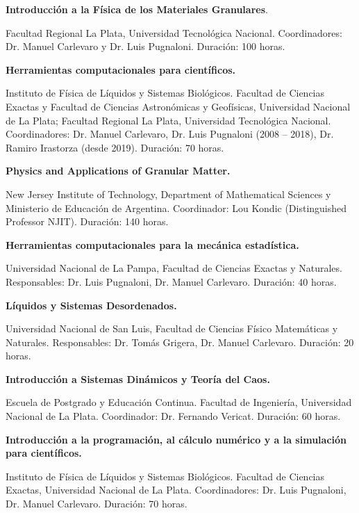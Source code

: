 \begin{timeline}
 \textbf{Introducción a la Física de los Materiales Granulares}. 

Facultad Regional La Plata, Universidad Tecnológica Nacional. Coordinadores: Dr. Manuel Carlevaro y Dr. Luis Pugnaloni. Duración: 100 horas.

 \textbf{Herramientas computacionales para científicos.}

 Instituto de Física de Líquidos y Sistemas Biológicos. Facultad de Ciencias Exactas y Facultad de Ciencias Astronómicas y Geofísicas, Universidad Nacional de La Plata; Facultad Regional La Plata, Universidad Tecnológica Nacional. Coordinadores: Dr. Manuel Carlevaro, Dr. Luis Pugnaloni (2008 -- 2018), Dr. Ramiro Irastorza (desde 2019). Duración: 70 horas.

 \textbf{Physics and Applications of Granular Matter.}

New Jersey Institute of Technology, Department of Mathematical Sciences y Ministerio de Educación de Argentina. Coordinador: Lou Kondic (Distinguished Professor NJIT). Duración: 140 horas.

  \textbf{Herramientas computacionales para la mecánica estadística.}

Universidad Nacional de La Pampa, Facultad de Ciencias Exactas y Naturales. Responsables: Dr. Luis Pugnaloni, Dr. Manuel Carlevaro. Duración: 40 horas.

 
 \textbf{Líquidos y Sistemas Desordenados.}

Universidad Nacional de San Luis, Facultad de Ciencias Físico Matemáticas y Naturales. Responsables: Dr. Tomás Grigera, Dr. Manuel Carlevaro. Duración: 20 horas.


  \textbf{Introducción a Sistemas Dinámicos y Teoría del Caos.}
 
 Escuela de Postgrado y Educación Continua. Facultad de Ingeniería, Universidad Nacional de La Plata. Coordinador: Dr. Fernando Vericat. Duración: 60 horas.
 
  \textbf{Introducción a la programación, al cálculo numérico y a la simulación para científicos.}
 
 Instituto de Física de Líquidos y Sistemas Biológicos. Facultad de Ciencias Exactas, Universidad Nacional de La Plata. Coordinadores: Dr. Luis Pugnaloni, Dr. Manuel Carlevaro. Duración: 70 horas.
\end{timeline}
